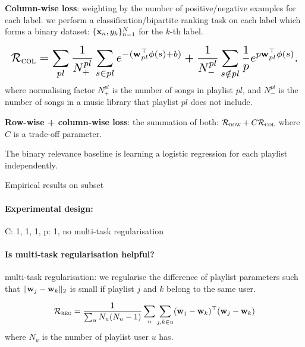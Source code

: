 {\bf Column-wise loss}: weighting by the number of positive/negative examples for each label.
\ie we perform a classification/bipartite ranking task on each label which forms a binary dataset:
$\{\mathbf{x}_n, y_k\}_{n=1}^N$ for the $k$-th label.

\begin{equation*}
\resizebox{\linewidth}{!}{$
\RCal_\textsc{col} 
= \displaystyle \sum_{pl}
  \frac{1}{N_+^{pl}} \sum_{s \in pl} e^{-(\w_{pl}^\top \phi(s) + b)} +
  \frac{1}{N_-^{pl}} \sum_{s \notin pl} \frac{1}{p} e^{p \w_{pl}^\top \phi(s)}.
$}
\end{equation*}
where normalising factor $N_+^{pl}$ is the number of songs in playlist $pl$,
and $N_-^{pl}$ is the number of songs in a music library that playlist $pl$ does not include.


{\bf Row-wise + column-wise loss}: the summation of both: $\mathcal{R}_\textsc{row} + C \mathcal{R}_\textsc{col}$ 
where $C$ is a trade-off parameter.

The binary relevance baseline is learning a logistic regression for each playlist independently.


Empirical results on subset \\

\paragraph{Experimental design:}
C: 1, 1, 1, p: 1, no multi-task regularisation


\paragraph{Is multi-task regularisation helpful?}

multi-task regularisation: we regularise the difference of playlist parameters 
such that $\|\mathbf{w}_j - \mathbf{w}_k\|_2$ is small if playlist $j$ and $k$ belong to the same user.

\begin{equation*}
\mathcal{R}_\textsc{reg} = \frac{1}{\sum_u N_u (N_u - 1)} \sum_u \sum_{j, k \in u} (\mathbf{w}_j - \mathbf{w}_k)^\top (\mathbf{w}_j - \mathbf{w}_k)
\end{equation*}
where $N_u$ is the number of playlist user $u$ has.

